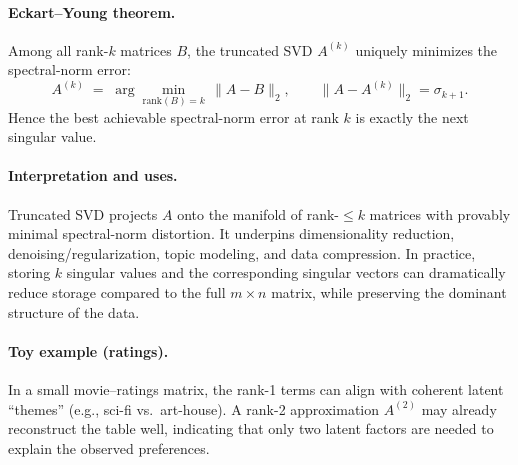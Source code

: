 \paragraph{Eckart--Young theorem.}
Among all rank-\(k\) matrices \(B\), the truncated SVD \(A^{(k)}\) uniquely minimizes
the spectral-norm error:
\[
A^{(k)} \;=\; \arg\min_{\mathrm{rank}(B)=k}\, \|A-B\|_2,
\qquad
\|A - A^{(k)}\|_2 = \sigma_{k+1}.
\]
Hence the best achievable spectral-norm error at rank \(k\) is exactly the next
singular value. %

\paragraph{Interpretation and uses.}
Truncated SVD projects \(A\) onto the manifold of rank-\(\le k\) matrices with
provably minimal spectral-norm distortion. It underpins dimensionality
reduction, denoising/regularization, topic modeling, and data compression.
In practice, storing \(k\) singular values and the corresponding singular vectors
can dramatically reduce storage compared to the full \(m\times n\) matrix, while
preserving the dominant structure of the data. %

\paragraph{Toy example (ratings).}
In a small movie–ratings matrix, the rank-1 terms can align with coherent
latent ``themes'' (e.g., sci-fi vs.\ art-house). A rank-2 approximation
\(A^{(2)}\) may already reconstruct the table well, indicating that only two
latent factors are needed to explain the observed preferences. %



